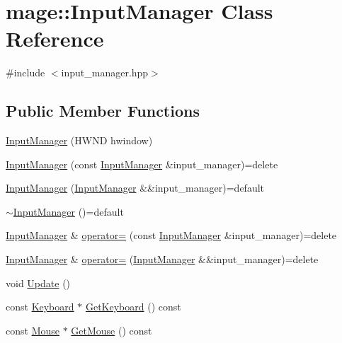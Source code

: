 \hypertarget{classmage_1_1_input_manager}{}\section{mage\+:\+:Input\+Manager Class Reference}
\label{classmage_1_1_input_manager}


{\ttfamily \#include $<$input\+\_\+manager.\+hpp$>$}

\subsection*{Public Member Functions}
\begin{DoxyCompactItemize}
\item 
\hyperlink{classmage_1_1_input_manager_afc28df27a0251c242113a9761c007534}{Input\+Manager} (H\+W\+ND hwindow)
\item 
\hyperlink{classmage_1_1_input_manager_a68503617f418bf270dc39bb18019b46d}{Input\+Manager} (const \hyperlink{classmage_1_1_input_manager}{Input\+Manager} \&input\+\_\+manager)=delete
\item 
\hyperlink{classmage_1_1_input_manager_a93de208333f18b4c61ec72d0a28d0d51}{Input\+Manager} (\hyperlink{classmage_1_1_input_manager}{Input\+Manager} \&\&input\+\_\+manager)=default
\item 
\hyperlink{classmage_1_1_input_manager_afb025b87d9448365593bab11e6e775a2}{$\sim$\+Input\+Manager} ()=default
\item 
\hyperlink{classmage_1_1_input_manager}{Input\+Manager} \& \hyperlink{classmage_1_1_input_manager_ad9caa8b7e99a69b774887f342bd5dda0}{operator=} (const \hyperlink{classmage_1_1_input_manager}{Input\+Manager} \&input\+\_\+manager)=delete
\item 
\hyperlink{classmage_1_1_input_manager}{Input\+Manager} \& \hyperlink{classmage_1_1_input_manager_ae7c1c4d2d55d86cbc88a5fbc2f1279a8}{operator=} (\hyperlink{classmage_1_1_input_manager}{Input\+Manager} \&\&input\+\_\+manager)=delete
\item 
void \hyperlink{classmage_1_1_input_manager_a5e516969ff4ae9876b98c28f48f93726}{Update} ()
\item 
const \hyperlink{classmage_1_1_keyboard}{Keyboard} $\ast$ \hyperlink{classmage_1_1_input_manager_a5b72139e30d1f3da6cda50f2989c1350}{Get\+Keyboard} () const
\item 
const \hyperlink{classmage_1_1_mouse}{Mouse} $\ast$ \hyperlink{classmage_1_1_input_manager_ad268916e07f44e40bf267efa0e673186}{Get\+Mouse} () const
\end{DoxyCompactItemize}
